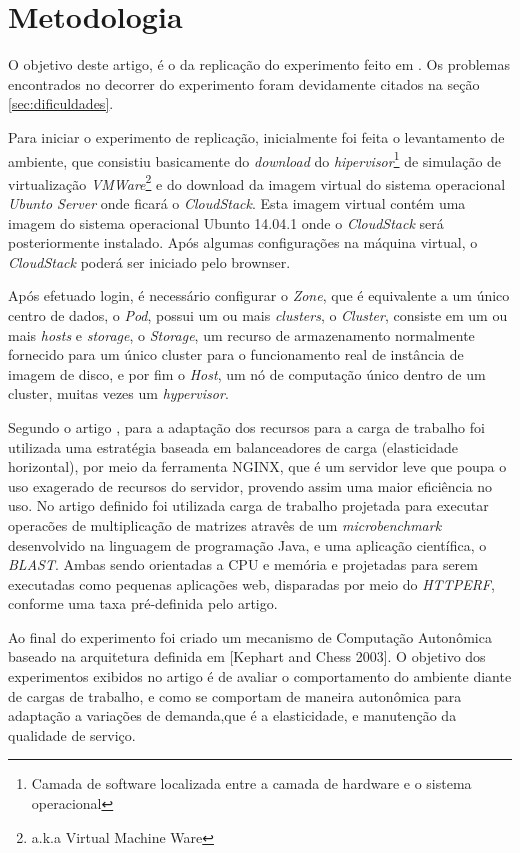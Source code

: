 \section{Metodologia}
\label{sec:metodologia}

O objetivo deste artigo, é o da replicação do experimento feito em \cite{coutinho_et_al:14}. Os problemas encontrados no decorrer do experimento foram devidamente citados na seção \ref{sec:dificuldades}.

Para iniciar o experimento de replicação, inicialmente foi feita o levantamento de ambiente, que consistiu basicamente do \textit{download} do \textit{hipervisor}\footnote{Camada de software localizada entre a camada de hardware e o sistema operacional\cite{dev_midia}} de simulação de virtualização \textit{VMWare}\footnote{a.k.a Virtual Machine Ware} e do download da imagem virtual do sistema operacional \textit{Ubunto Server} onde ficará o \textit{CloudStack}. Esta imagem virtual contém uma imagem do sistema operacional Ubunto 14.04.1 onde o \textit{CloudStack} será posteriormente instalado. Após algumas configurações na máquina virtual, o \textit{CloudStack} poderá ser iniciado pelo brownser.

Após efetuado login, é necessário configurar o \textit{Zone}, que é equivalente a um único centro de dados, o \textit{Pod}, possui um ou mais \textit{clusters}, o \textit{Cluster}, consiste em um ou mais \textit{hosts} e \textit{storage}, o \textit{Storage}, um recurso de armazenamento normalmente fornecido para um único cluster para o funcionamento real de instância de imagem de disco, e por fim o \textit{Host}, um nó de computação único dentro de um cluster, muitas vezes um \textit{hypervisor}.

Segundo o artigo \cite{coutinho_et_al:14}, para a adaptação dos recursos para a carga de trabalho foi utilizada uma estratégia baseada em balanceadores de carga (elasticidade horizontal), por meio da ferramenta NGINX, que é um servidor leve que poupa o uso exagerado de recursos do servidor, provendo assim uma maior eficiência no uso. No artigo definido foi utilizada carga de trabalho projetada para executar operacões de multiplicação de matrizes atravês de um \textit{microbenchmark} desenvolvido na linguagem de programação Java, e uma aplicação científica, o \textit{BLAST}. Ambas sendo orientadas a CPU e memória e projetadas para serem executadas como pequenas aplicações web, disparadas por meio do \textit{HTTPERF}, conforme uma taxa pré-definida pelo artigo.

Ao final do experimento foi criado um mecanismo de Computação Autonômica baseado na arquitetura definida em [Kephart and Chess 2003]. O objetivo dos experimentos exibidos no artigo é de avaliar o comportamento do ambiente diante de cargas de trabalho, e como se comportam de maneira autonômica para adaptação a variações de demanda,que é a elasticidade, e manutenção da qualidade de serviço.
